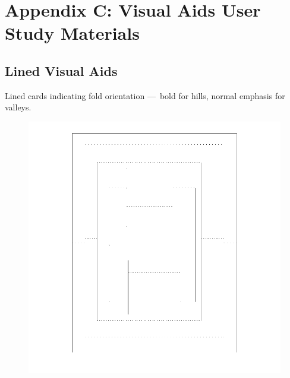 \section{Appendix C: Visual Aids User Study
Materials}\label{appendix-c-visual-aids-user-study-materials}

\subsection{Lined Visual Aids}\label{lined-visual-aids}

Lined cards indicating fold orientation ---~bold for hills, normal
emphasis for valleys.

\begin{figure}[htbp]
\centering
\includegraphics{figures/92_Appendix_Visual_Aids_Materials/lined_card1.png}
\caption{}
\end{figure}

